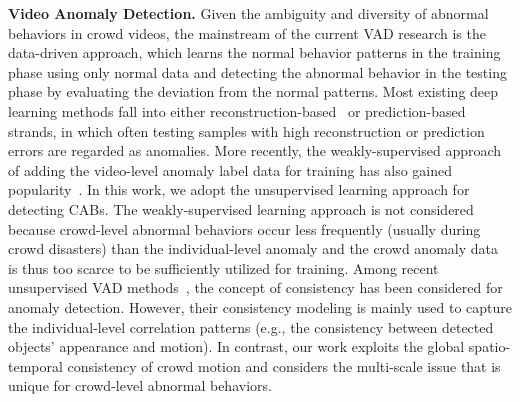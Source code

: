 \documentclass[journal]{IEEEtran}
\begin{document}
\noindent\textbf{Video Anomaly Detection.} Given the ambiguity and diversity of abnormal behaviors in crowd videos, the mainstream of the current VAD research is the data-driven approach, which learns the normal behavior patterns in the training phase using only normal data and detecting the abnormal behavior in the testing phase by evaluating the deviation from the normal patterns. Most existing deep learning methods fall into either reconstruction-based~\cite{nguyen2019anomaly,zhou2019anomalynet,park2020learning,yu2023tifs} or prediction-based~\cite{liu2018future,ye2019anopcn,cai2021appearance,chen2022comprehensive,luo2022pami,cao2024context} strands, in which often testing samples with high reconstruction or prediction errors are regarded as anomalies. More recently, the weakly-supervised approach of adding the video-level anomaly label data for training has also gained popularity~\cite{zhong2019graph,feng2021mist,li2022self,liu2023tbm,wu2024vadclip}.
In this work, we adopt the unsupervised learning approach for detecting CABs. The weakly-supervised learning approach is not considered because crowd-level abnormal behaviors occur less frequently (usually during crowd disasters) than the individual-level anomaly and the crowd anomaly data is thus too scarce to be sufficiently utilized for training. Among recent unsupervised VAD methods~\cite{cai2021appearance,chen2022comprehensive}, the concept of consistency has been considered for anomaly detection. However, their consistency modeling is mainly used to capture the individual-level correlation patterns (e.g., the consistency between detected objects' appearance and motion). In contrast, our work exploits the global spatio-temporal consistency of crowd motion and considers the multi-scale issue that is unique for crowd-level abnormal behaviors.
\end{document}
